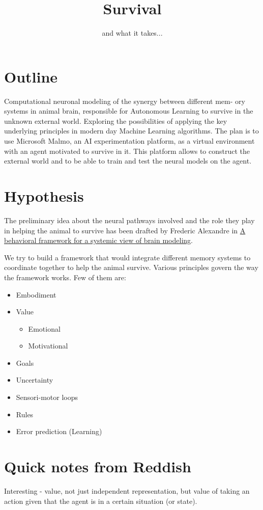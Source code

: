 \documentclass{article}
\title{Survival}
\author{and what it takes...}
\date{ }
\begin{document}
\maketitle
\tableofcontents
\clearpage

\section{Outline}
Computational neuronal modeling of the synergy between different mem-
ory systems in animal brain, responsible for Autonomous Learning to
survive in the unknown external world.  Exploring the possibilities of
applying the key underlying principles in modern day Machine Learning
algorithms. The plan is to use Microsoft Malmo, an AI experimentation
platform, as a virtual environment with an agent motivated to survive in
it. This platform allows to construct the external world and to be able
to train and test the neural models on the agent.

\section{Hypothesis}
%
The preliminary idea about the neural pathways involved and the role they play in helping the animal to survive has been drafted by Frederic Alexandre in \href{https://hal.inria.fr/hal-01246653/}{A behavioral framework for a systemic view of brain modeling}.

We try to build a framework that would integrate different memory systems to coordinate together to help the animal survive. Various principles govern the way the framework works. Few of them are:
\begin{itemize}
\item Embodiment
\item Value
\begin{itemize}
\item Emotional
\item Motivational
\end{itemize} 
\item Goals
\item Uncertainty
\item Sensori-motor loops
\item Rules
\item Error prediction (Learning)
\end{itemize} 

\clearpage
\section{Quick notes from Reddish}
\par Interesting - value, not just independent representation, but 
value of taking an action given that the agent
is in a certain situation (or state).
\\
\end{document}
